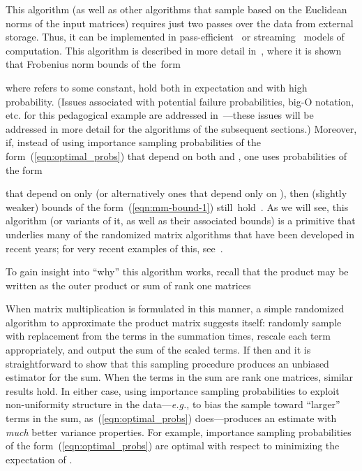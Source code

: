 \documentclass[twoside]{article}
\begin{document}
This algorithm (as well as other algorithms that sample based on 
the Euclidean norms of the input matrices) requires just two passes over the 
data from external storage.  Thus, it can be implemented in 
pass-efficient~\cite{dkm_matrix1} or streaming~\cite{Muthu05} models of 
computation.
This algorithm is described in more detail in~\cite{dkm_matrix1},
where it is shown that Frobenius norm bounds of the~form

where  refers to some constant,
hold both in expectation and with high probability.
(Issues associated with potential failure probabilities, big-O notation, 
etc. for this pedagogical example are addressed in~\cite{dkm_matrix1}---these issues will be addressed in more detail for the algorithms of the 
subsequent sections.)
Moreover, 
if, instead of using 
importance sampling probabilities of the form~(\ref{eqn:optimal_probs}) 
that depend on both  and , one uses probabilities of the form 

that depend on only  (or alternatively ones that depend only on
), then (slightly weaker) bounds of the form~(\ref{eqn:mm-bound-1}) 
still~hold~\cite{dkm_matrix1}.
As we will see, this algorithm (or variants of it, as well as their associated 
bounds) is a primitive that underlies many of the randomized matrix 
algorithms that have been developed in recent years; for very recent
examples of this, see~\cite{MZ11,ESSWAI11}.

To gain insight into ``why'' this algorithm works, recall that the product 
 may be written as the outer product or sum of  rank one matrices

When matrix multiplication is formulated in this manner, a simple randomized 
algorithm to approximate the product matrix  suggests itself: 
randomly sample with replacement from the terms in the summation  times, 
rescale each term appropriately, and output the sum of the scaled terms.
If  then  and it is straightforward 
to show that this sampling procedure produces an unbiased estimator for the 
sum.
When the terms in the sum are rank one matrices, similar results hold.  
In either case, using importance sampling probabilities to exploit 
non-uniformity structure in the data---\emph{e.g.}, to bias the sample
toward ``larger'' terms in the sum, as~(\ref{eqn:optimal_probs}) 
does---produces an estimate with \emph{much} better variance properties.
For example, importance sampling probabilities of the 
form~(\ref{eqn:optimal_probs}) are optimal with respect to minimizing the
expectation of .
\end{document}
